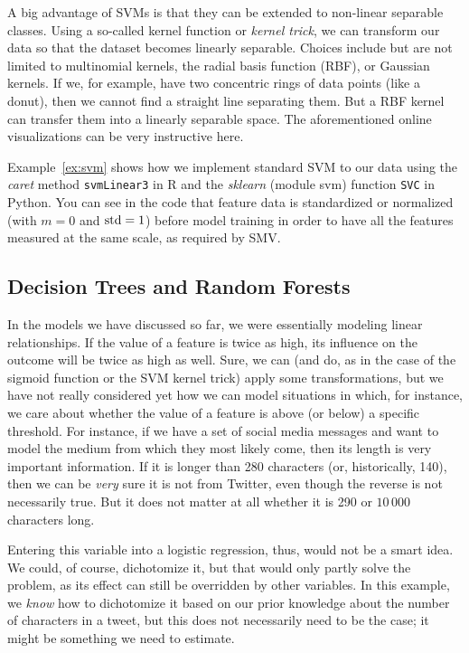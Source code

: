 A big advantage of SVMs is that they can be extended to non-linear
separable classes. Using a so-called kernel function or \emph{kernel trick}, we can transform
our data so that the dataset becomes linearly separable. Choices
include but are not limited to multinomial kernels, the radial basis
function (RBF), or Gaussian kernels. If we, for example, have  two
concentric rings of data points (like a donut), then we cannot find a
straight line separating them. But a RBF kernel can transfer them into
a linearly separable space. The aforementioned online visualizations
can be very instructive here.

Example~\ref{ex:svm} shows how we implement standard SVM to our data using the \emph{caret} method \texttt{svmLinear3} in R and the \emph{sklearn} (module svm) function \texttt{SVC} in Python. You can see in the code that feature data is standardized or normalized (with $m = 0$ and $\rm{std} = 1$) before model training in order to have all the features measured at the same scale, as required by SMV.




\subsection{Decision Trees and Random Forests} \label{subsec:randomforest}

In the models we have discussed so far, we were essentially  modeling linear
relationships. If the value of a feature is twice as high, its
influence on the outcome will be twice as high as well.  Sure, we can
(and do, as in the case of the sigmoid function or the SVM kernel trick) apply some
transformations, but we have not really considered yet how we can
model situations in which, for instance, we care about whether the
value of a feature is above (or below) a specific threshold.  For
instance, if we have a set of social media messages and want to model
the medium from which they most likely come, then its length is very
important information. If it is longer than 280 characters (or,
historically, 140), then we can be \emph{very} sure it is not from
Twitter, even though the reverse is not necessarily true. But it does
not matter at all whether it is 290 or $10\,000$ characters long.

Entering this variable into a logistic regression, thus, would not be
a smart idea.  We could, of course, dichotomize it, but that would
only partly solve the problem, as its effect can still be overridden by other variables.  In this example, we \emph{know} how to
dichotomize it based on our prior knowledge about the number of
characters in a tweet, but this does not necessarily need to be the
case; it might be something we need to estimate.

